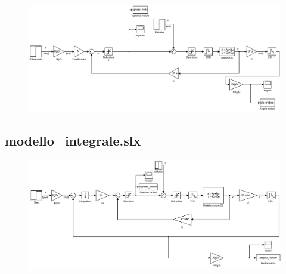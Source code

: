 		\begin{figure}[H]
			\centering
			\includegraphics[scale=0.6]{./Figure/SIMULINK/modello_feedforward.pdf}
		\end{figure}			
		
	\subsection{modello\_integrale.slx}
	\label{subapp:modelloIntegrale}
	
		\begin{figure}[H]
			\centering
			\includegraphics[scale=0.6]{./Figure/SIMULINK/modello_integrale.pdf}
		\end{figure}		
		